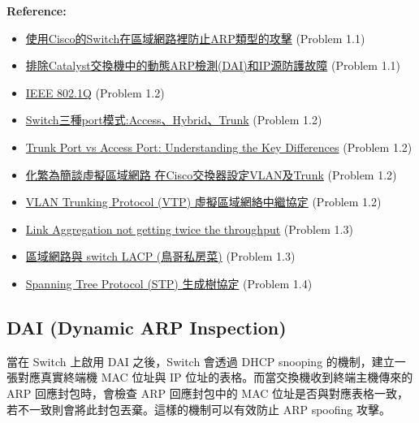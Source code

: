 \documentclass[12pt]{article}
\newenvironment{mycolorbox}[1][gray]{
  \renewmdenv[
    linewidth=2pt, linecolor=#1, backgroundcolor=#1!10,
    topline=false, bottomline=false, rightline=false,
    skipabove=10pt, skipbelow=10pt, innerleftmargin=10pt,
    innerrightmargin=0pt, innertopmargin=5pt, innerbottommargin=5pt
  ]{myquote}
  \begin{myquote}
}{\end{myquote}}
\begin{document}
\begin{mycolorbox}[teal]
  \textbf{Reference:}
  \begin{itemize}
    \item \href{https://www.uuu.com.tw/Public/content/article/16/160822tips.htm}{使用Cisco的Switch在區域網路裡防止ARP類型的攻擊} (Problem 1.1)
    \item \href{https://www.cisco.com/c/zh_tw/support/docs/switches/lan-switch-software/222274-troubleshoot-dynamic-arp-inspection-dai.html}{排除Catalyst交換機中的動態ARP檢測(DAI)和IP源防護故障} (Problem 1.1)
    \item \href{https://zh.wikipedia.org/zh-tw/IEEE_802.1Q}{IEEE 802.1Q} (Problem 1.2)
    \item \href{https://weihanit.wordpress.com/2017/07/27/switch%E4%B8%89%E7%A8%AEport%E6%A8%A1%E5%BC%8Faccess%E3%80%81hybrid%E3%80%81trunk%E8%A1%8C%E7%82%BA%E6%A8%A1%E5%BC%8F/}{Switch三種port模式:Access、Hybrid、Trunk} (Problem 1.2)
    \item \href{https://www.lindenphotonics.com/trunk-port-vs-access-port-understanding-the-key-differences}{Trunk Port vs Access Port: Understanding the Key Differences} (Problem 1.2)
    \item \href{https://www.netadmin.com.tw/netadmin/zh-tw/feature/0C1A2DDB3CF94296864832049D8897A4}{化繁為簡談虛擬區域網路 在Cisco交換器設定VLAN及Trunk} (Problem 1.2)
    \item \href{https://www.jannet.hk/vlan-trunking-protocol-vtp-zh-hant/}{VLAN Trunking Protocol (VTP) 虛擬區域網絡中繼協定} (Problem 1.2)
    \item \href{https://www.reddit.com/r/HomeNetworking/comments/d7lyq4/link_aggregation_not_getting_twice_the_throughput/}{Link Aggregation not getting twice the throughput} (Problem 1.3)
    \item \href{https://www.vbird.org/events/network_lacp.php}{區域網路與 switch LACP (鳥哥私房菜)} (Problem 1.3)
    \item \href{https://www.jannet.hk/spanning-tree-protocol-stp-zh-hant/}{Spanning Tree Protocol (STP) 生成樹協定} (Problem 1.4)
  \end{itemize}
\end{mycolorbox}

\subsection{DAI (Dynamic ARP Inspection)}
當在 Switch 上啟用 DAI 之後，Switch 會透過 DHCP snooping 的機制，建立一張對應真實終端機 MAC 位址與 IP 位址的表格。而當交換機收到終端主機傳來的 ARP 回應封包時，會檢查 ARP 回應封包中的 MAC 位址是否與對應表格一致，若不一致則會將此封包丟棄。這樣的機制可以有效防止 ARP spoofing 攻擊。
\end{document}
